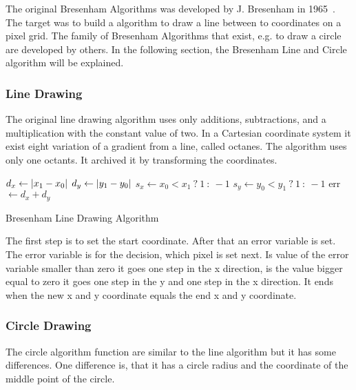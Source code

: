 The original Bresenham Algorithms was developed by J. Bresenham in 1965~\cite{Bresenham65Line}. The target was to build a algorithm to draw a line between to coordinates on a pixel grid. The family of Bresenham Algorithms that exist, e.g. to draw a circle are developed by others. In the following section, the Bresenham Line and Circle algorithm will be explained.
\subsubsection*{Line Drawing}
The original line drawing algorithm uses only additions, subtractions, and a multiplication with the constant value of two. In a Cartesian coordinate system it exist eight variation of a gradient from a line, called octanes. The algorithm uses only one octants. It archived it by transforming the coordinates.

\begin{algorithm}[H]
	\SetAlgoLined
	\(d_x \gets \lvert x_1 - x_0\rvert\)\;
	\(d_y \gets \lvert y_1 - y_0\rvert\)\;
	\(s_x \gets x_0 < x_1~ ? ~1 ~:~ -1 \)\;
	\(s_y \gets y_0 < y_1~ ?~ 1 ~:~ -1\)\;
	err \( \gets d_x + d_y \)
	
	
	\caption{Bresenham Line Drawing Algorithm}
	\label{alg:bresline}
\end{algorithm}

The first step is to set the start coordinate. After that an error variable is set. The error variable is for the decision, which pixel is set next. Is value of the error variable smaller than zero it goes one step in the x direction, is the value bigger equal to zero it goes one step in the y and one step in the x direction. It ends when the new x and y coordinate equals the end x and y coordinate.
 
\subsubsection*{Circle Drawing}
The circle algorithm function are similar to the line algorithm but it has some differences. One difference is, that it has a circle radius and the coordinate of the middle point of the circle.